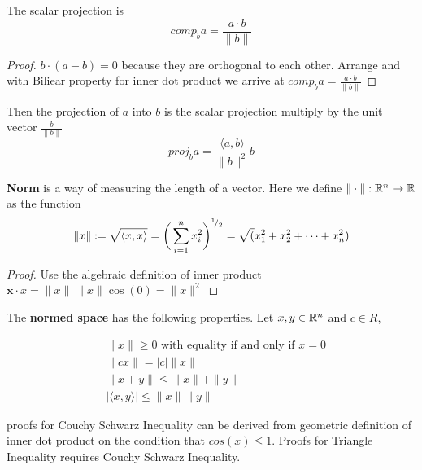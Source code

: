 \documentclass[11pt]{article}
\begin{document}
\begin{defn}
  \label{projection}
  The scalar projection is
  \[
    comp_b a = \frac{a \cdot b}{\| b\|}
  \]
  \begin{proof}
    $b \cdot (a-b) = 0$ because they are orthogonal to each other. Arrange and with Biliear property for inner dot product we arrive at $comp_b a = \frac{a \cdot b}{\| b\|}$
  \end{proof}
  Then the projection of $a$ into $b$ is the scalar projection multiply by the unit vector $\frac{b}{\|b\|}$
  \[
    proj_b a = \frac{\langle a, b \rangle}{\|b\|^2}b
  \]
\end{defn}


\begin{defn}
  \label{norm}
  \textbf{Norm} is a way of measuring the length of a vector. Here we define $\|\cdot \|: \mathbb{R}^n \rightarrow \mathbb{R}$ as the function
  \[
    \|x\| := \sqrt{\langle x,x\rangle} = \bigg(\sum_{i=1}^n x_i^2\bigg)^{{}^{1}\!/_{2}} = \sqrt(x_1^2 + x_2^2 + \dots + x_n^2)
  \]

  \begin{proof}
    Use the algebraic definition of inner product $\mathbf {x} \cdot x =\|x \|\ \|x \|\cos(0) = \|x\|^2$
  \end{proof}


  The \textbf{normed space} has the following properties. Let $x,y\in \mathbb{R}^n$ and $c\in R$,
  \label{norm space}

  \begin{align}
    & \| x\| \geq 0 \text{ with equality if and only if } x=0\tag{Non-degeneracy} \\
    & \|cx\| = |c| \|x\| \tag{Normality} \\
    & \| x+y\| \leq \|x\| + \|y \| \tag{Triangle Inequality}\label{Norm triangle Inequality} \\
    & |\langle x,y \rangle | \leq \|x\| \| y\| \tag{Couchy Schwarz Inequality} \label{Couchy Schwarz Inequality}
  \end{align}

  \begin{rem}
    proofs for Couchy Schwarz Inequality can be derived from geometric definition of inner dot product on the condition that $cos(x) \leq 1$. Proofs for Triangle Inequality requires Couchy Schwarz Inequality.
  \end{rem}
\end{defn}
\end{document}
